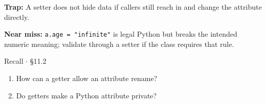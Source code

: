 \documentclass[11pt]{article}
\begin{document}
\begin{keepsection}
\begin{notebox}\textbf{Trap:} A setter does not hide data if callers still reach in and change the attribute directly.\end{notebox}

\begin{notebox}\textbf{Near miss:} \texttt{a.age = "infinite"} is legal Python but breaks the intended numeric meaning; validate through a setter if the class requires that rule.\end{notebox}

\begin{recallbox}{Recall \ensuremath{\cdot} §11.2}
\begin{enumerate}
\item How can a getter allow an attribute rename?
\item Do getters make a Python attribute private?
\end{enumerate}

\end{recallbox}
\end{keepsection}
\end{document}
